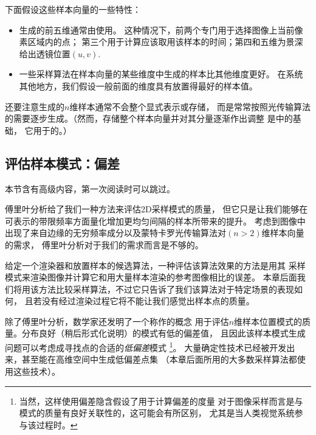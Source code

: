 下面假设这些样本向量的一些特性：
\begin{itemize}
    \item {}生成的前五维通常由使用。
          这种情况下，前两个专门用于选择图像上当前像素区域内的点；
          第三个用于计算应该取用该样本的时间；第四和五维为景深给出透镜位置$(u,v)$.
    \item 一些采样算法在样本向量的某些维度中生成的样本比其他维度更好。
          在系统其他地方，我们假设一般前面的维度具有放置得最好的样本值。
\end{itemize}

还要注意生成的$n$维样本通常不会整个显式表示或存储，
而是常常按照光传输算法的需要逐步生成。（然而，存储整个样本向量并对其分量逐渐作出调整
是中的基础，
它用于的。）

\subsection{评估样本模式：偏差}\label{sub:评价样本模式：偏差}
\begin{remark}
    本节含有高级内容，第一次阅读时可以跳过。
\end{remark}

傅里叶分析给了我们一种方法来评估2D采样模式的质量，
但它只是让我们能够在可表示的带限频率方面量化增加更均匀间隔的样本所带来的提升。
考虑到图像中出现了来自边缘的无穷频率成分以及蒙特卡罗光传输算法对$(n>2)$维样本向量的需求，
傅里叶分析对于我们的需求而言是不够的。

给定一个渲染器和放置样本的候选算法，一种评估该算法效果的方法是用其
采样模式来渲染图像并计算它和用大量样本渲染的参考图像相比的误差。
本章后面我们将用该方法比较采样算法，不过它只告诉了我们该算法对于特定场景的表现如何，
且若没有经过渲染过程它将不能让我们感觉出样本点的质量。

除了傅里叶分析，数学家还发明了一个称作的概念
用于评估$n$维样本位置模式的质量。分布良好（稍后形式化说明）的模式有低的偏差值，
且因此该样本模式生成问题可以考虑成寻找点的合适的\emph{低偏差}模式
\footnote{当然，这样使用偏差隐含假设了用于计算偏差的度量
    对于图像采样而言是与模式的质量有良好关联性的，这可能会有所区别，
    尤其是当人类视觉系统参与该过程时。}。
大量确定性技术已经被开发出来，甚至能在高维空间中生成低偏差点集
（本章后面所用的大多数采样算法都使用这些技术）。

